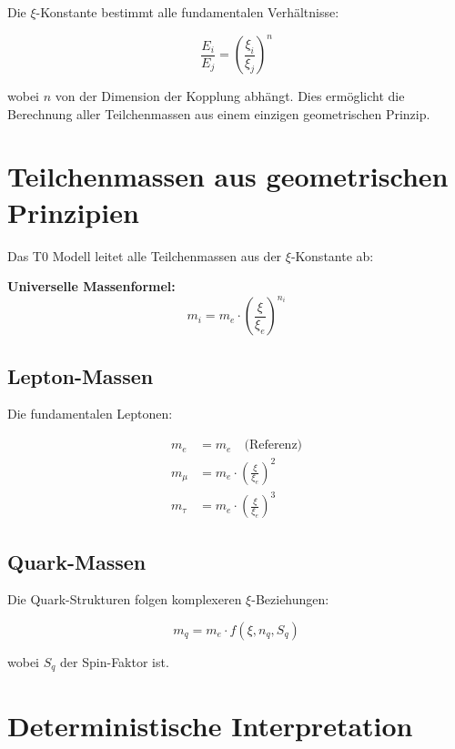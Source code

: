 Die $\xi$-Konstante bestimmt alle fundamentalen Verhältnisse:

\begin{equation}
	\frac{E_i}{E_j} = \left(\frac{\xi_i}{\xi_j}\right)^n
\end{equation}

wobei $n$ von der Dimension der Kopplung abhängt. Dies ermöglicht die Berechnung aller Teilchenmassen aus einem einzigen geometrischen Prinzip.

	
	\section{Teilchenmassen aus geometrischen Prinzipien}
	
	Das T0 Modell leitet alle Teilchenmassen aus der $\xi$-Konstante ab:
	
	\begin{formel}
		\textbf{Universelle Massenformel:}
		\begin{equation}
			m_i = m_e \cdot \left(\frac{\xi}{\xi_e}\right)^{n_i}
		\end{equation}
	\end{formel}
	
	\subsection{Lepton-Massen}
	
	Die fundamentalen Leptonen:
	
	\begin{align}
		m_e &= m_e \quad \text{(Referenz)} \\
		m_\mu &= m_e \cdot \left(\frac{\xi}{\xi_e}\right)^2 \\
		m_\tau &= m_e \cdot \left(\frac{\xi}{\xi_e}\right)^3
	\end{align}
	
	\subsection{Quark-Massen}
	
	Die Quark-Strukturen folgen komplexeren $\xi$-Beziehungen:
	
	\begin{equation}
		m_q = m_e \cdot f(\xi, n_q, S_q)
	\end{equation}
	
	wobei $S_q$ der Spin-Faktor ist.
	

	
	\section{Deterministische Interpretation}
	
